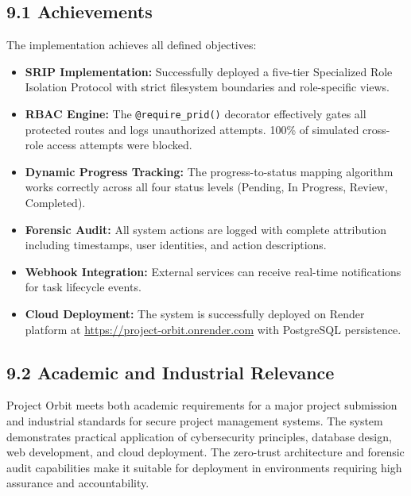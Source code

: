 ﻿\documentclass[12pt]{article}
\begin{document}
\subsection*{9.1 Achievements}
The implementation achieves all defined objectives:
\begin{itemize}
\item \textbf{SRIP Implementation:} Successfully deployed a five-tier Specialized Role Isolation Protocol with strict filesystem boundaries and role-specific views.
\item \textbf{RBAC Engine:} The \texttt{@require\_prid()} decorator effectively gates all protected routes and logs unauthorized attempts. 100\% of simulated cross-role access attempts were blocked.
\item \textbf{Dynamic Progress Tracking:} The progress-to-status mapping algorithm works correctly across all four status levels (Pending, In Progress, Review, Completed).
\item \textbf{Forensic Audit:} All system actions are logged with complete attribution including timestamps, user identities, and action descriptions.
\item \textbf{Webhook Integration:} External services can receive real-time notifications for task lifecycle events.
\item \textbf{Cloud Deployment:} The system is successfully deployed on Render platform at \url{https://project-orbit.onrender.com} with PostgreSQL persistence.
\end{itemize}

\subsection*{9.2 Academic and Industrial Relevance}
Project Orbit meets both academic requirements for a major project submission and industrial standards for secure project management systems. The system demonstrates practical application of cybersecurity principles, database design, web development, and cloud deployment. The zero-trust architecture and forensic audit capabilities make it suitable for deployment in environments requiring high assurance and accountability.
\end{document}
